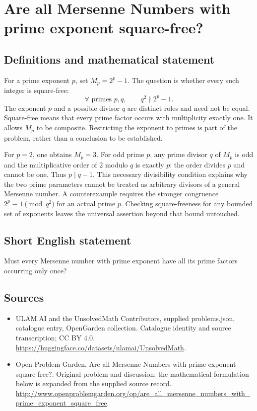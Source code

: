 \documentclass[11pt,a4paper]{article}
\begin{document}
\section*{Are all Mersenne Numbers with prime exponent square-free?}\label{statement}

\subsection{Definitions and mathematical statement}
For a prime exponent $p$, set $M_p=2^p-1$. The question is whether
every such integer is square-free:
\[
 \forall\text{ primes }p,q,\qquad q^2\nmid 2^p-1.
\]
The exponent $p$ and a possible divisor $q$ are distinct roles and
need not be equal. Square-free means that every prime factor occurs
with multiplicity exactly one. It allows $M_p$ to be composite.
Restricting the exponent to primes is part of the problem, rather
than a conclusion to be established.

For $p=2$, one obtains $M_p=3$. For odd prime $p$, any prime divisor
$q$ of $M_p$ is odd and the multiplicative order of $2$ modulo $q$
is exactly $p$: the order divides $p$ and cannot be one. Thus
$p\mid q-1$. This necessary divisibility condition explains why the
two prime parameters cannot be treated as arbitrary divisors of a
general Mersenne number. A counterexample requires the stronger
congruence $2^p\equiv1\pmod{q^2}$ for an actual prime $p$.
Checking square-freeness for any bounded set of exponents leaves the
universal assertion beyond that bound untouched.
\subsection{Short English statement}
Must every Mersenne number with prime exponent have all its prime factors occurring only once?
\subsection{Sources}
\begin{itemize}
\item[S1] ULAM.AI and the UnsolvedMath Contributors, supplied problems.json, catalogue entry, OpenGarden collection. Catalogue identity and source transcription; CC BY 4.0.
\url{https://huggingface.co/datasets/ulamai/UnsolvedMath}.
\item[S2] Open Problem Garden, Are all Mersenne Numbers with prime exponent square-free?. Original problem and discussion; the mathematical formulation below is expanded from the supplied source record.
\url{http://www.openproblemgarden.org/op/are_all_mersenne_numbers_with_prime_exponent_square_free}.
\end{itemize}
\end{document}
